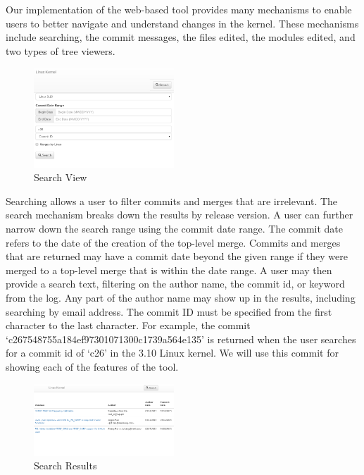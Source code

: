 \documentclass[conference, draftclsnofoot]{IEEEtran}
\begin{document}
Our implementation of the web-based tool provides many mechanisms to enable
users to better navigate and understand changes in the kernel. These mechanisms
include searching, the commit messages, the files edited, the modules edited,
and two types of tree viewers.

\begin{figure}[h]
        \centering
        \includegraphics[width=0.47\textwidth]{figures/search.png}
        \caption{Search View}
        \label{fig:search}
\end{figure}

Searching allows a user to filter commits and merges that are irrelevant.
The search mechanism breaks down the results by release version. A user can
further narrow down the search range using the commit date range. The commit
date refers to the date of the creation of the top-level merge. Commits and
merges that are returned may have a commit date beyond the given range if they
were merged to a top-level merge that is within the date range. A user may then
provide a search text, filtering on the author name, the commit id, or keyword
from the log. Any part of the author name may show up in the results, including
searching by email address. The commit ID must be specified from the first
character to the last character. For example, the commit
`c267548755a184ef97301071300c1739a564e135' is returned when the user searches
for a commit id of `c26' in the 3.10 Linux kernel. We will use this commit for
showing each of the features of the tool.

\begin{figure}[h]
        \centering
        \includegraphics[width=0.47\textwidth]{figures/search_results.png}
        \caption{Search Results}
        \label{fig:results}
\end{figure}
\end{document}
